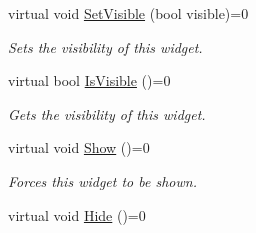 \begin{DoxyCompactItemize}
virtual void \hyperlink{classphys_1_1UI_1_1Cell_aceb2d399897a502d99c72b2e9e5c859e}{SetVisible} (bool visible)=0
\begin{DoxyCompactList}\small\item\em Sets the visibility of this widget. \item\end{DoxyCompactList}\item 
virtual bool \hyperlink{classphys_1_1UI_1_1Cell_a77625842ac8ad87bd5b5a7f6ed0590b8}{IsVisible} ()=0
\begin{DoxyCompactList}\small\item\em Gets the visibility of this widget. \item\end{DoxyCompactList}\item 
\hypertarget{classphys_1_1UI_1_1Cell_ae0d424d873b9bb8712afbcc1bd548dc0}{
virtual void \hyperlink{classphys_1_1UI_1_1Cell_ae0d424d873b9bb8712afbcc1bd548dc0}{Show} ()=0}
\label{df/d1e/classphys_1_1UI_1_1Cell_ae0d424d873b9bb8712afbcc1bd548dc0}

\begin{DoxyCompactList}\small\item\em Forces this widget to be shown. \item\end{DoxyCompactList}\item 
\hypertarget{classphys_1_1UI_1_1Cell_a73b4c96e986bbd0f28cc542bcc4c8d7c}{
virtual void \hyperlink{classphys_1_1UI_1_1Cell_a73b4c96e986bbd0f28cc542bcc4c8d7c}{Hide} ()=0}
\label{df/d1e/classphys_1_1UI_1_1Cell_a73b4c96e986bbd0f28cc542bcc4c8d7c}


\end{DoxyCompactItemize}
